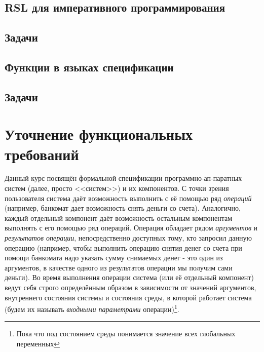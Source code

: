 \documentclass[14pt, twoside]{extreport}
\newcounter{problem_type}[chapter]
\begin{document}
\section{RSL для императивного программирования}

    

    \section*{Задачи}

    

\section{Функции в языках спецификации}

    

    \section*{Задачи}

    

    




\chapter{Уточнение функциональных требований}



Данный курс посвящён формальной спецификации программно-ап-паратных систем (далее, просто <<систем>>) и их компонентов. С точки зрения пользователя система даёт возможность выполнить с её помощью ряд \emph{операций} (например, банкомат дает возможность снять деньги со счета). Аналогично, каждый отдельный компонент даёт возможность остальным компонентам выполнять с его помощью ряд операций. Операция обладает рядом \emph{аргументов} и \emph{результатов операции}, непосредственно доступных тому, кто запросил данную операцию (например, чтобы выполнить операцию снятия денег со счета при помощи банкомата надо указать сумму снимаемых денег - это один из аргументов, в качестве одного из результатов операции мы получим сами деньги). Во время выполнения операции система (или её отдельный компонент) ведут себя строго определённым образом в зависимости от значений аргументов, внутреннего состояния системы и состояния среды, в которой работает система (будем их называть \emph{входными параметрами} операции)\footnote{Пока что под состоянием среды понимается значение всех глобальных переменных}.
\end{document}
